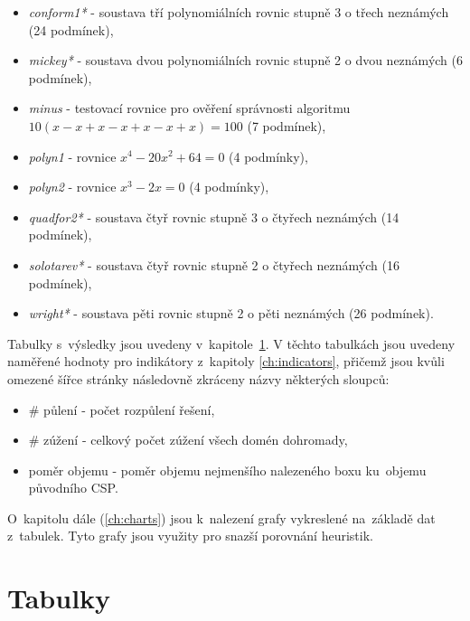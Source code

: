 {\begin{itemize}
    \item \emph{conform1*} - soustava tří polynomiálních rovnic stupně 3 o třech neznámých (24 podmínek),
    \item \emph{mickey*} - soustava dvou polynomiálních rovnic stupně 2 o dvou neznámých (6 podmínek),
    \item \emph{minus} - testovací rovnice pro ověření správnosti algoritmu $10(x - x + x - x + x - x + x) = 100$ (7 podmínek),
    \item \emph{polyn1} - rovnice $x^4 - 20x^2 + 64 = 0$ (4 podmínky),
    \item \emph{polyn2} - rovnice $x^3 - 2x = 0$ (4 podmínky),
    \item \emph{quadfor2*} - soustava čtyř rovnic stupně 3 o čtyřech neznámých (14 podmínek),
    \item \emph{solotarev*} - soustava čtyř rovnic stupně 2 o čtyřech neznámých (16 podmínek),
    \item \emph{wright*} - soustava pěti rovnic stupně 2 o pěti neznámých (26 podmínek).
\end{itemize}

Tabulky s~výsledky jsou uvedeny v~kapitole~\ref{ch:resultTables}. V těchto tabulkách jsou uvedeny naměřené hodnoty pro indikátory z~kapitoly \ref{ch:indicators}, přičemž jsou kvůli omezené šířce stránky následovně zkráceny názvy některých sloupců:


\begin{itemize}
    \item \# půlení - počet rozpůlení řešení,
    \item \# zúžení - celkový počet zúžení všech domén dohromady,
    \item poměr objemu - poměr objemu nejmenšího nalezeného boxu ku~objemu původního CSP.
\end{itemize}

O~kapitolu dále (\ref{ch:charts}) jsou k~nalezení grafy vykreslené na~základě dat z~tabulek. Tyto grafy jsou využity pro snazší porovnání heuristik.


\section{Tabulky}
\label{ch:resultTables}


}
